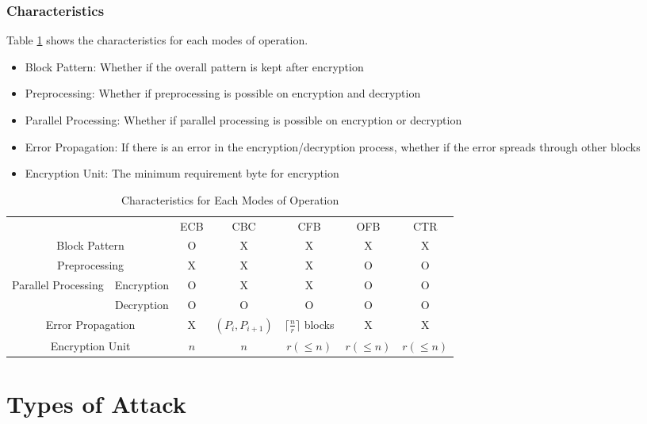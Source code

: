 \documentclass{report}
\begin{document}
				\subsubsection{Characteristics}
				Table \ref{table-mode-of-operation} shows the characteristics for each modes of operation.
				\begin{itemize}
					\item Block Pattern: Whether if the overall pattern is kept after encryption
					\item Preprocessing: Whether if preprocessing is possible on encryption and decryption
					\item Parallel Processing: Whether if parallel processing is possible on encryption or decryption
					\item Error Propagation: If there is an error in the encryption/decryption process, whether if the error spreads through other blocks
					\item Encryption Unit: The minimum requirement byte for encryption
				\end{itemize}
				\begin{table}[]
					\begin{tabular}{ccccccc}
						\multicolumn{2}{c}{}                              & ECB & CBC         & CFB         & OFB & CTR \\
						\multicolumn{2}{c}{Block Pattern}                 & O   & X           & X           & X   & X   \\
						\multicolumn{2}{c}{Preprocessing}                 & X   & X           & X           & O   & O   \\
						\multirow{2}{*}{Parallel Processing} & Encryption & O   & X           & X           & O   & O   \\
						& Decryption & O   & O           & O           & O   & O   \\
						\multicolumn{2}{c}{Error Propagation}             & X   & $(P_i,P_{i+1})$ & $\lceil \frac{n}{r} \rceil$ blocks & X   & X   \\
						\multicolumn{2}{c}{Encryption Unit}               & $n$   & $n$           & $r (\leq n)$           & $r (\leq n)$   & $r (\leq n)$  
					\end{tabular}
					\caption{Characteristics for Each Modes of Operation}
					\label{table-mode-of-operation}
				\end{table}
			
	\section{Types of Attack}
\end{document}
